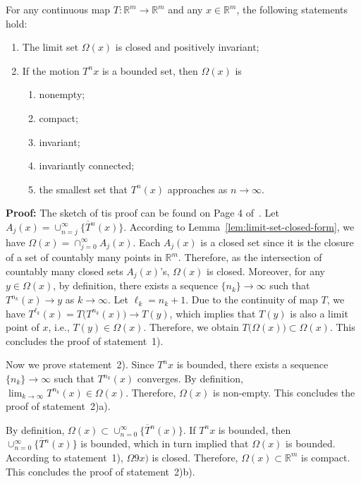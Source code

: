 \documentclass[10pt]{svmult}
\begin{document}
\begin{lemma}\label{lem:limit-set-inv-asym}
For any continuous map $T:\mathbb{R}^{m}\to \mathbb{R}^m$ and any $x\in \mathbb{R}^m$, the following statements hold:
\begin{enumerate}[label=\arabic*)]
\item The limit set $\Omega(x)$ is closed and positively invariant;
\item If the motion $T^n x$ is a bounded set, then $\Omega(x)$ is
   \begin{enumerate}[label=\alph*)]
   \item nonempty;
   \item compact;
   \item invariant;
   \item invariantly connected;
   \item the smallest set that $T^n(x)$ approaches as $n\to \infty$.
   \end{enumerate}    
\end{enumerate}
\end{lemma}

\textbf{Proof:} The sketch of tis proof can be found on Page 4 of~\cite{JPL:76}. Let $A_j(x)=\overline{\cup_{n=j}^{\infty}\{T^n(x)\}}$. According to Lemma~\ref{lem:limit-set-closed-form}, we have $\Omega(x)=\cap_{j=0}^{\infty}A_j(x)$. Each $A_j(x)$ is a closed set since it is the closure of a set of countably many points in $\mathbb{R}^m$. Therefore, as the intersection of countably many closed sets $A_j(x)$'s, $\Omega(x)$ is closed. Moreover, for any $y\in \Omega(x)$, by definition, there exists a sequence $\{n_k\}\to \infty$ such that $T^{n_k}(x)\to y$ as $k\to \infty$. Let $\ell_k=n_k+1$. Due to the continuity of map $T$, we have $T^{\ell_k}(x)=T\big(T^{n_k}(x)\big)\to T(y)$, which implies that $T(y)$ is also a limit point of $x$, i.e., $T(y)\in \Omega(x)$. Therefore, we obtain $T\big(\Omega(x)\big)\subset \Omega(x)$. This concludes the proof of statement~1). 

Now we prove statement~2). Since $T^n x$ is bounded, there exists a sequence $\{n_k\}\to \infty$ such that $T^{n_k}(x)$ converges. By definition, $\lim_{k\to \infty}T^{n_k}(x)\in \Omega(x)$. Therefore, $\Omega(x)$ is non-empty. This concludes the proof of statement~2)a).

By definition, $\Omega(x)\subset \overline{\cup_{n=0}^{\infty}\{T^n (x)\}}$. If $T^n x$ is bounded, then $\overline{\cup_{n=0}^{\infty}\{T^n (x)\}}$ is bounded, which in turn implied that $\Omega(x)$ is bounded. According to statement~1), $\Omega9x)$ is closed. Therefore, $\Omega(x)\subset \mathbb{R}^m$ is compact. This concludes the proof of statement~2)b).
\end{document}
